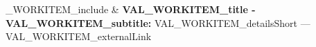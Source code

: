%
\ifVAL_WORKITEM_include%
        & \textbf{VAL_WORKITEM_title - VAL_WORKITEM_subtitle:}%
        VAL_WORKITEM_detailsShort%
        --- VAL_WORKITEM_externalLink%
        \\%
        \fi%
